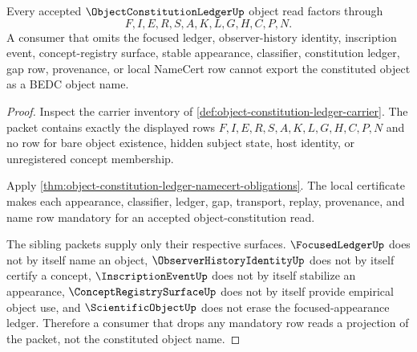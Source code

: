 \begin{theorem}
\label{thm:object-constitution-ledger-non-escape}
Every accepted $\ObjectConstitutionLedgerUp$ object read factors through
$$
F,I,E,R,S,A,K,L,G,H,C,P,N.
$$
A consumer that omits the focused ledger, observer-history identity, inscription event, concept-registry surface, stable appearance, classifier, constitution ledger, gap row, provenance, or local NameCert row cannot export the constituted object as a BEDC object name.
\end{theorem}
\begin{proof}
Inspect the carrier inventory of \autoref{def:object-constitution-ledger-carrier}. The packet contains exactly the displayed rows $F,I,E,R,S,A,K,L,G,H,C,P,N$ and no row for bare object existence, hidden subject state, host identity, or unregistered concept membership.

Apply \autoref{thm:object-constitution-ledger-namecert-obligations}. The local certificate makes each appearance, classifier, ledger, gap, transport, replay, provenance, and name row mandatory for an accepted object-constitution read.

The sibling packets supply only their respective surfaces. $\FocusedLedgerUp$ does not by itself name an object, $\ObserverHistoryIdentityUp$ does not by itself certify a concept, $\InscriptionEventUp$ does not by itself stabilize an appearance, $\ConceptRegistrySurfaceUp$ does not by itself provide empirical object use, and $\ScientificObjectUp$ does not erase the focused-appearance ledger. Therefore a consumer that drops any mandatory row reads a projection of the packet, not the constituted object name.
\end{proof}



